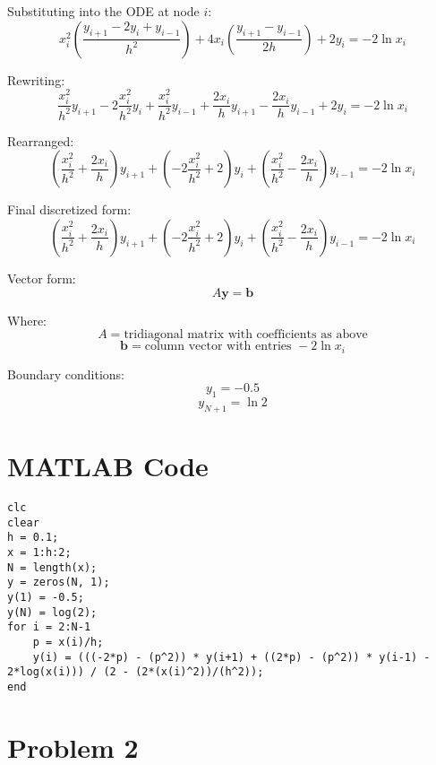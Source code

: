 \documentclass{article}
\begin{document}
Substituting into the ODE at node $i$:
\[
x_i^2 \left( \frac{y_{i+1} - 2y_i + y_{i-1}}{h^2} \right) + 4x_i \left( \frac{y_{i+1} - y_{i-1}}{2h} \right) + 2y_i = -2\ln x_i
\]

Rewriting:
\[
\frac{x_i^2}{h^2} y_{i+1} - 2\frac{x_i^2}{h^2} y_i + \frac{x_i^2}{h^2} y_{i-1} + \frac{2x_i}{h} y_{i+1} - \frac{2x_i}{h} y_{i-1} + 2y_i = -2\ln x_i
\]

Rearranged:
\[
\left( \frac{x_i^2}{h^2} + \frac{2x_i}{h} \right) y_{i+1} + \left( -2\frac{x_i^2}{h^2} + 2 \right) y_i + \left( \frac{x_i^2}{h^2} - \frac{2x_i}{h} \right) y_{i-1} = -2\ln x_i
\]

Final discretized form:
\[
\left( \frac{x_i^2}{h^2} + \frac{2x_i}{h} \right) y_{i+1} + \left( -2\frac{x_i^2}{h^2} + 2 \right) y_i + \left( \frac{x_i^2}{h^2} - \frac{2x_i}{h} \right) y_{i-1} = -2\ln x_i
\]

Vector form:
\[
A \mathbf{y} = \mathbf{b}
\]

Where:
\[
A = \text{tridiagonal matrix with coefficients as above}
\]
\[
\mathbf{b} = \text{column vector with entries } -2 \ln x_i
\]

Boundary conditions:
\[
y_1 = -0.5
\]
\[
y_{N+1} = \ln 2
\]

\section*{MATLAB Code}


\begin{tcolorbox}[title=MATLAB code to solve using Jordan method:]
\begin{lstlisting}
clc
clear
h = 0.1;
x = 1:h:2;
N = length(x);
y = zeros(N, 1);
y(1) = -0.5;
y(N) = log(2);
for i = 2:N-1
    p = x(i)/h;
    y(i) = (((-2*p) - (p^2)) * y(i+1) + ((2*p) - (p^2)) * y(i-1) - 2*log(x(i))) / (2 - (2*(x(i)^2))/(h^2));
end
\end{lstlisting}
\end{tcolorbox}

\newpage


\section*{Problem 2}
\end{document}
